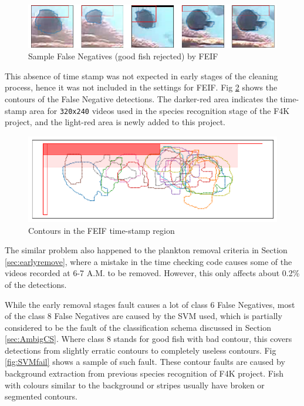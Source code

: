 \documentclass[bsc,logo,twoside,fullspacing,parskip]{infthesis}
\begin{document}
\begin{figure}[ht]
    \centering
    \includegraphics[scale=0.40]{graph/FEIFfail.png}
    \caption{Sample False Negatives (good fish rejected) by FEIF}
    \label{fig:feiffail}
\end{figure}

This absence of time stamp was not expected in early stages of the cleaning process, hence it was not included in the settings for FEIF. 
Fig \ref{fig:feiffail2} shows the contours of the False Negative detections.
The darker-red area indicates the time-stamp area for {\tt 320x240} videos used in the species recognition stage of the F4K project, and the light-red area is newly added to this project.

\begin{figure}[h]
    \centering
    \includegraphics[scale=0.30]{graph/feiffail.png}
    \caption{Contours in the FEIF time-stamp region}
    \label{fig:feiffail2}
\end{figure}

The similar problem also happened to the plankton removal criteria in Section \ref{sec:earlyremove}, where a mistake in the time checking code causes some of the videos recorded at 6-7 A.M. to be removed. 
However, this only affects about 0.2\% of the detections.

While the early removal stages fault causes a lot of class 6 False Negatives, most of the class 8 False Negatives are caused by the SVM used, which is partially considered to be the fault of the classification schema discussed in Section \ref{sec:AmbigCS}.
Where class 8 stands for good fish with bad contour, this covers detections from slightly erratic contours to completely useless contours.
Fig \ref{fig:SVMfail} shows a sample of such fault. 
These contour faults are caused by background extraction from previous species recognition of F4K project.
Fish with colours similar to the background or stripes usually have broken or segmented contours.
\end{document}
